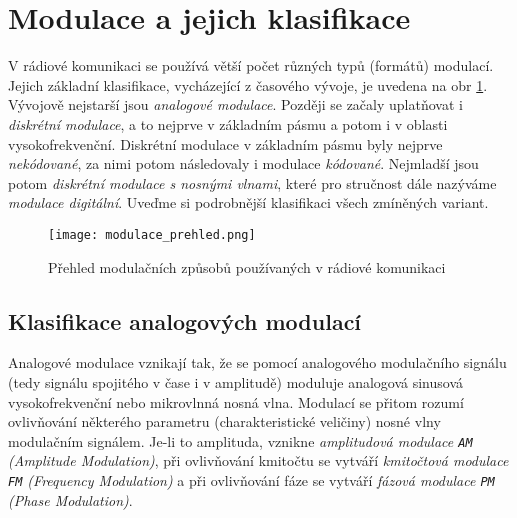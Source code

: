   \section{Modulace a jejich klasifikace}
    V rádiové komunikaci se používá větší počet různých typů (formátů) modulací. Jejich základní 
    klasifikace, vycházející z časového vývoje, je uvedena na obr \ref{fig_RA:modulace03}. Vývojově 
    nejstarší jsou \emph{analogové modulace}. Později se začaly uplatňovat i \emph{diskrétní 
    modulace}, a to nejprve v základním pásmu a potom i v oblasti vysokofrekvenční. Diskrétní 
    modulace v základním pásmu byly nejprve \emph{nekódované}, za nimi potom následovaly i modulace 
    \emph{kódované}. Nejmladší jsou potom \emph{diskrétní modulace s nosnými vlnami}, které pro 
    stručnost dále nazýváme \emph{modulace digitální}. Uveďme si podrobnější klasifikaci všech 
    zmíněných variant. \cite[s.~82]{ZaludRA}
    \begin{figure}[ht!]  %
      \centering
      \texttt{[image: modulace\_prehled.png]}
      \caption{Přehled modulačních způsobů používaných v rádiové komunikaci
                \cite[s.~82]{ZaludRA}}
      \label{fig_RA:modulace03}
    \end{figure}
    
    \subsection{Klasifikace analogových modulací}
      Analogové modulace vznikají tak, že se pomocí analogového modulačního signálu (tedy signálu 
      spojitého v čase i v amplitudě) moduluje analogová sinusová vysokofrekvenční nebo mikrovlnná 
      nosná vlna. Modulací se přitom rozumí ovlivňování některého parametru (charakteristické 
      veličiny) nosné vlny modulačním signálem. Je-li to amplituda, vznikne \emph{amplitudová 
      modulace \texttt{AM} (Amplitude Modulation)}, při ovlivňování kmitočtu se vytváří 
      \emph{kmitočtová modulace \texttt{FM} (Frequency Modulation)} a při ovlivňování fáze se 
      vytváří \emph{fázová modulace \texttt{PM} (Phase Modulation)}.
      
